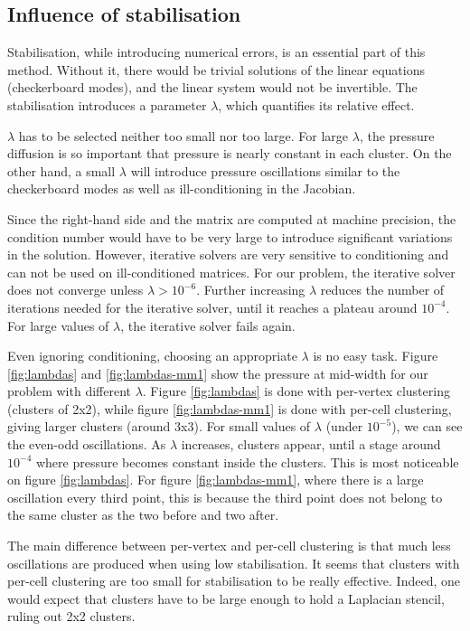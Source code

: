 \documentclass[12pt]{article}
\begin{document}
\subsection{Influence of stabilisation}
\label{sec:stab}
Stabilisation, while introducing numerical errors, is an essential
part of this method. Without it, there would be trivial solutions of
the linear equations (checkerboard modes), and the linear system would
not be invertible. The stabilisation introduces a parameter $\lambda$,
which quantifies its relative effect.

$\lambda$ has to be selected neither too small nor too large. For
large $\lambda$, the pressure diffusion is so important that pressure
is nearly constant in each cluster. On the other hand, a small
$\lambda$ will introduce pressure oscillations similar to the
checkerboard modes as well as ill-conditioning in the Jacobian.

Since the right-hand side and the matrix are computed at machine
precision, the condition number would have to be very large to
introduce significant variations in the solution. However, iterative
solvers are very sensitive to conditioning and can not be used on
ill-conditioned matrices. For our problem, the iterative solver does
not converge unless $\lambda > 10^{-6}$. Further increasing $\lambda$
reduces the number of iterations needed for the iterative solver,
until it reaches a plateau around $10^{-4}$. For large values of
$\lambda$, the iterative solver fails again.

Even ignoring conditioning, choosing an appropriate $\lambda$ is no
easy task. Figure \ref{fig:lambdas} and \ref{fig:lambdas-mm1} show the
pressure at mid-width for our problem with different $\lambda$. Figure
\ref{fig:lambdas} is done with per-vertex clustering (clusters of
2x2), while figure \ref{fig:lambdas-mm1} is done with per-cell
clustering, giving larger clusters (around 3x3).  For small values of
$\lambda$ (under $10^{-5}$), we can see the even-odd oscillations. As
$\lambda$ increases, clusters appear, until a stage around $10^{-4}$
where pressure becomes constant inside the clusters. This is most
noticeable on figure \ref{fig:lambdas}. For figure
\ref{fig:lambdas-mm1}, where there is a large oscillation every third
point, this is because the third point does not belong to the same
cluster as the two before and two after.

The main difference between per-vertex and per-cell clustering is that
much less oscillations are produced when using low stabilisation. It
seems that clusters with per-cell clustering are too small for
stabilisation to be really effective. Indeed, one would expect
that clusters have to be large enough to hold a Laplacian stencil,
ruling out 2x2 clusters.
\end{document}
